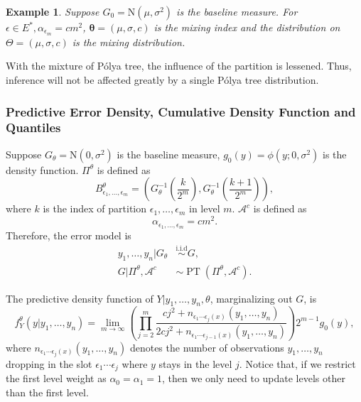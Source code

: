 \documentclass[12pt]{article}
\newtheorem{emp}[thm]{Example}
\newcommand{\polya}{P\'{o}lya}
\newcommand{\iid}{\stackrel{\text{i.i.d}}{\sim}}
\DeclareMathOperator{\pt}{PT}
\begin{document}
\begin{emp}
  Suppose $G_0 = \mathrm{N}(\mu, \sigma^2)$ is the baseline measure.
  For $\epsilon \in E^{*}, \alpha_{\epsilon_m} = cm^2 $, $\bm{\theta}=
  (\mu, \sigma, c)$ is the mixing index and the distribution on
  $\Theta = (\mu, \sigma, c) $ is the mixing distribution.
\end{emp}
With the mixture of \polya{} tree, the influence of the partition is
lessened. Thus, inference will not be affected greatly by a single
\polya{} tree distribution.

\subsubsection{Predictive Error Density, Cumulative Density Function
  and Quantiles}
Suppose $G_{\theta} = \mathrm{N}(0, \sigma^2)$ is the baseline
measure, $g_0(y) = \phi(y; 0, \sigma^2)$ is the density
function. $\Pi^{\theta}$ is defined as
\begin{displaymath}
  B^{\theta}_{\epsilon_1, \ldots, \epsilon_m} = \left( G^{-1}_{\theta}
    \left( \frac{k}{2^m} \right), G^{-1}_{\theta}\left( \frac{k+1}{2^m} \right) \right),
\end{displaymath}
where $k$ is the index of partition $\epsilon_1, \ldots, \epsilon_m$
in level $m$. $\mathcal{A}^c$ is defined as
\begin{displaymath}
  \alpha_{\epsilon_1, \ldots, \epsilon_m} = cm^2.
\end{displaymath}
Therefore, the error model is
\begin{align*}
  y_1, \ldots, y_n |G_{\theta} & \iid G, \\
  G|\Pi^{\theta}, \mathcal{A}^{c} & \sim \pt (\Pi^{\theta},
  \mathcal{A}^{c}).
\end{align*}

The predictive density function of $Y|y_1, \ldots, y_n, \theta$,
marginalizing out $G$, is
\begin{equation}
  \label{eq:pred}
  f_Y^{\theta} (y|y_1, \ldots, y_n)  = \lim_{m \to \infty} \left(
    \prod_{j=2}^m \frac{cj^2 + n_{\epsilon_1 \cdots \epsilon_j(x) }(y_1, \ldots, y_n)}{2cj^2
      + n_{\epsilon_1 \cdots \epsilon_{j-1}(x)}(y_1, \ldots, y_n)}
  \right)2^{m-1} g_0(y),
\end{equation}
where $n_{\epsilon_1 \cdots \epsilon_j(x) }(y_1, \ldots, y_n)$
denotes the number of observations $y_1, \ldots, y_n$ dropping in the
slot $\epsilon_1 \cdots \epsilon_j$ where $y$ stays in the level
$j$. Notice that, if we restrict the first level weight as
$\alpha_0=\alpha_1=1$, then we only need to update levels other than
the first level.
\end{document}
